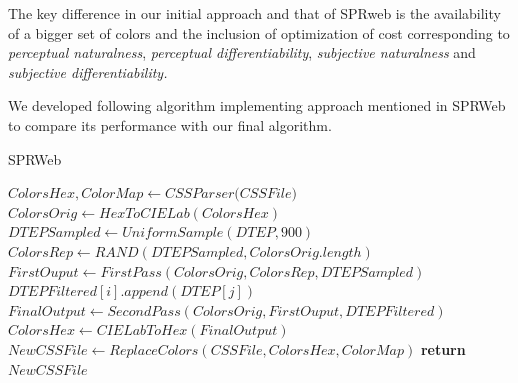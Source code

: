 The key difference in our initial approach and that of SPRweb is the availability of a bigger set of colors and the inclusion of optimization of cost corresponding to \textit{perceptual naturalness}, \textit{perceptual differentiability}, \textit{subjective naturalness} and \textit{subjective differentiability.}

We developed following algorithm implementing approach mentioned in SPRWeb to compare its performance with our final algorithm. 


\makeatletter
\def\BState{\State\hskip-\ALG@thistlm}
\makeatother

\begin{algorithm}[!htb]
\caption{SPRWeb}\label{SPRWeb}
\begin{algorithmic}[1]
\State ${ColorsHex,ColorMap} \gets \textit{CSSParser(CSSFile)}$
\State $ColorsOrig \gets HexToCIELab(ColorsHex)$
\State $DTEPSampled \gets UniformSample(DTEP,900)$ 
\State $ColorsRep \gets RAND(DTEPSampled,ColorsOrig.length)$ 
\State $FirstOuput \gets FirstPass(ColorsOrig,ColorsRep,DTEPSampled)$
		 
			\State $DTEPFiltered[i].append(DTEP[j])$
		\EndIf
	\EndFor
\EndFor
\State $FinalOutput\gets SecondPass(ColorsOrig,FirstOuput,DTEPFiltered)$
\State $ColorsHex \gets CIELabToHex(FinalOutput)$
\State $NewCSSFile \gets ReplaceColors(CSSFile, ColorsHex, ColorMap)$
\State \textbf{return} $NewCSSFile$
\EndProcedure
{}

\end{algorithmic}
\end{algorithm}

